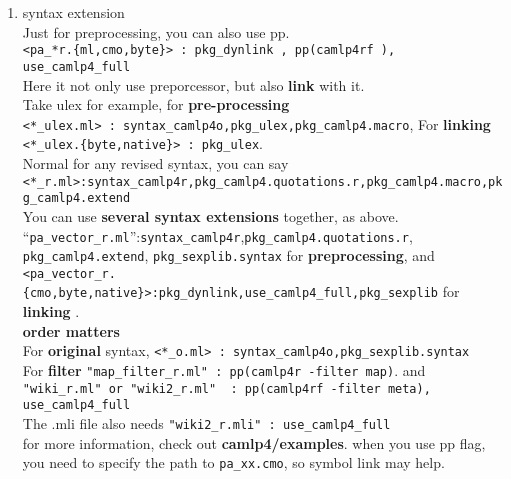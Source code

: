\begin{enumerate}
\begin{enumerate}
\item syntax extension \\ 
  Just for preprocessing, you can also use pp. \\
  \verb|<pa_*r.{ml,cmo,byte}> : pkg_dynlink , pp(camlp4rf ), use_camlp4_full| \\
  Here it not only use preporcessor, but also \textbf{ link} with it. \\
  Take ulex for example, for \textbf{ pre-processing} \\
  \verb|<*_ulex.ml> : syntax_camlp4o,pkg_ulex,pkg_camlp4.macro|,
  For \textbf{ linking} \\
  \verb|<*_ulex.{byte,native}> : pkg_ulex|. \\
  Normal for any revised syntax, you can say \\
  \verb|<*_r.ml>:syntax_camlp4r,pkg_camlp4.quotations.r,pkg_camlp4.macro,pkg_camlp4.extend| \\
  You can use \textbf{ several syntax extensions} together, as above. \\
  ``\verb|pa_vector_r.ml|'':\verb|syntax_camlp4r|,\verb|pkg_camlp4.quotations.r|,
  \verb|pkg_camlp4.extend|, \verb|pkg_sexplib.syntax|
  for \textbf{ preprocessing}, and \\
  \verb|<pa_vector_r.{cmo,byte,native}>:pkg_dynlink,use_camlp4_full,pkg_sexplib| for \textbf{ linking} . \\
  \textbf{ order matters}  \\
  For \textbf{ original} syntax, \verb|<*_o.ml> : syntax_camlp4o,pkg_sexplib.syntax| \\
  For \textbf{ filter} \verb|"map_filter_r.ml" : pp(camlp4r -filter map)|. and \\
  \verb|"wiki_r.ml" or "wiki2_r.ml"  : pp(camlp4rf -filter meta), use_camlp4_full|\\
  The .mli file also needs \verb|"wiki2_r.mli" : use_camlp4_full| \\
  for more information, check out \textbf{ camlp4/examples}. when you use pp flag, you need to specify the path to \verb|pa_xx.cmo|, so symbol link may help.
\end{enumerate}

\end{enumerate}
